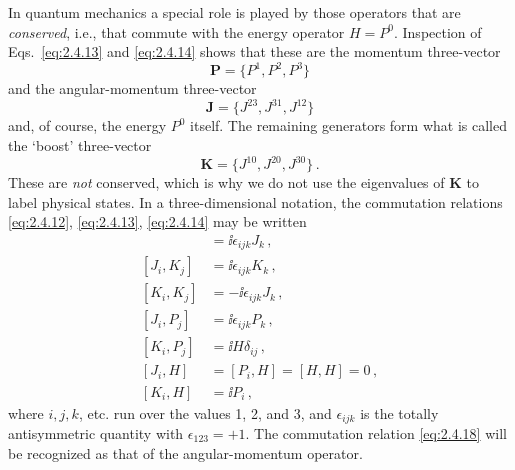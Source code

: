 In quantum mechanics a special role is played by those operators that are
\emph{conserved}, i.e., that commute with the energy operator $H=P^0$.
Inspection of Eqs.~\eqref{eq:2.4.13} and \eqref{eq:2.4.14} shows that these are the momentum
three-vector
\begin{equation}
\mathbf{P}=\{P^1,P^2,P^3\}
\tag{2.4.15}\label{eq:2.4.15}
\end{equation}
and the angular-momentum three-vector
\begin{equation}
\mathbf{J}=\{J^{23},J^{31},J^{12}\}
\tag{2.4.16}\label{eq:2.4.16}
\end{equation}
and, of course, the energy $P^0$ itself. The remaining generators form what is
called the `boost' three-vector
\begin{equation}
\mathbf{K}=\{J^{10},J^{20},J^{30}\}\,.
\tag{2.4.17}\label{eq:2.4.17}
\end{equation}
These are \emph{not} conserved, which is why we do not use the eigenvalues of
$\mathbf{K}$ to label physical states. In a three-dimensional notation, the
commutation relations \eqref{eq:2.4.12}, \eqref{eq:2.4.13}, \eqref{eq:2.4.14} may be written
\begin{align}
[J_i,J_j]&=\ii\epsilon_{ijk}J_k\,, \tag{2.4.18}\label{eq:2.4.18}\\
[J_i,K_j]&=\ii\epsilon_{ijk}K_k\,, \tag{2.4.19}\label{eq:2.4.19}\\
[K_i,K_j]&=-\ii\epsilon_{ijk}J_k\,, \tag{2.4.20}\label{eq:2.4.20}\\
[J_i,P_j]&=\ii\epsilon_{ijk}P_k\,, \tag{2.4.21}\label{eq:2.4.21}\\
[K_i,P_j]&=\ii H\delta_{ij}\,, \tag{2.4.22}\label{eq:2.4.22}\\
[J_i,H]&=[P_i,H]=[H,H]=0\,, \tag{2.4.23}\label{eq:2.4.23}\\
[K_i,H]&=\ii P_i\,, \tag{2.4.24}\label{eq:2.4.24}
\end{align}
where $i,j,k$, etc. run over the values 1, 2, and 3, and $\epsilon_{ijk}$ is
the totally antisymmetric quantity with $\epsilon_{123}=+1$. The commutation
relation \eqref{eq:2.4.18} will be recognized as that of the angular-momentum operator.

